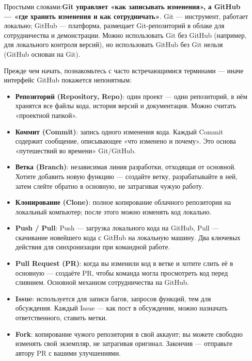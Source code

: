 Простыми словами:\textbf{Git управляет «как записывать изменения», а GitHub — «где хранить изменения и как сотрудничать»}. Git — инструмент, работает локально; GitHub — платформа, размещает Git-репозиторий в облаке для сотрудничества и демонстрации. Можно использовать Git без GitHub (например, для локального контроля версий), но использовать GitHub без Git нельзя (GitHub основан на Git).



Прежде чем начать, познакомьтесь с часто встречающимися терминами — иначе интерфейс GitHub покажется непонятным:

\begin{itemize}
  \item \textbf{Репозиторий (Repository, Repo)}: один проект — один репозиторий, в нём хранятся все файлы кода, история версий и документация. Можно считать «проектной папкой».
  \item \textbf{Коммит (Commit)}: запись одного изменения кода. Каждый Commit содержит сообщение, описывающее «что изменено и почему». Это основа «путешествий во времени» Git/GitHub.
  \item \textbf{Ветка (Branch)}: независимая линия разработки, отходящая от основной. Хотите добавить новую функцию — создайте ветку, разрабатывайте в ней, затем слейте обратно в основную, не затрагивая чужую работу.
  \item \textbf{Клонирование (Clone)}: полное копирование облачного репозитория на локальный компьютер; после этого можно изменять код локально.
  \item \textbf{Push / Pull}: Push — загрузка локального кода на GitHub, Pull — скачивание новейшего кода с GitHub на локальную машину. Два ключевых действия для синхронизации при командной работе.
  \item \textbf{Pull Request (PR)}: когда вы изменили код в ветке и хотите слить её в основную — создаёте PR, чтобы команда могла просмотреть код перед слиянием. Основной механизм сотрудничества на GitHub.
  \item \textbf{Issue}: используется для записи багов, запросов функций, тем для обсуждения. Каждый Issue — как пост в обсуждении, можно назначать ответственного, ставить метки.
  \item \textbf{Fork}: копирование чужого репозитория в свой аккаунт; вы можете свободно изменять свой экземпляр, не затрагивая оригинал. Закончив — отправьте автору PR с вашими улучшениями.
\end{itemize}


